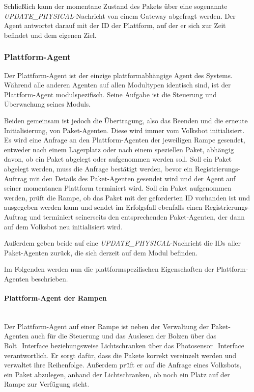 Schließlich kann der momentane Zustand des Pakets über eine sogenannte \textit{UPDATE\_PHYSICAL}-Nachricht von einem Gateway abgefragt werden. Der Agent antwortet darauf mit der ID der Plattform, auf der er sich zur Zeit befindet und dem eigenen Ziel.
\subsubsection{Plattform-Agent}
Der Plattform-Agent ist der einzige plattformabhängige Agent des Systems. Während alle anderen Agenten auf allen Modultypen identisch sind, ist der Plattform-Agent modulspezifisch. Seine Aufgabe ist die Steuerung und Überwachung seines Moduls.

Beiden gemeinsam ist jedoch die Übertragung, also das Beenden und die erneute Initialisierung, von Paket-Agenten. Diese wird immer vom Volksbot initialisiert. Es wird eine Anfrage an den Plattform-Agenten der jeweiligen Rampe gesendet, entweder nach einem Lagerplatz oder nach einem speziellen Paket, abhängig davon, ob ein Paket abgelegt oder aufgenommen werden soll. Soll ein Paket abgelegt werden, muss die Anfrage bestätigt werden, bevor ein Registrierungs-Auftrag mit den Details des Paket-Agenten gesendet wird und der Agent auf seiner momentanen Plattform terminiert wird. Soll ein Paket aufgenommen werden, prüft die Rampe, ob das Paket mit der geforderten ID vorhanden ist und ausgegeben werden kann und sendet im Erfolgsfall ebenfalls einen Registrierungs-Auftrag und terminiert seinerseits den  entsprechenden Paket-Agenten, der dann auf dem Volksbot neu initialisiert wird.

Außerdem geben beide auf eine \textit{UPDATE\_PHYSICAL}-Nachricht die IDs aller Paket-Agenten zurück, die sich derzeit auf dem Modul befinden.

Im Folgenden werden nun die plattformspezifischen Eigenschaften der Plattform-Agenten beschrieben.

\paragraph{Plattform-Agent der Rampen}\mbox{}\\
Der Plattform-Agent auf einer Rampe ist neben der Verwaltung der Paket-Agenten auch für die Steuerung und das Auslesen der Bolzen über das Bolt\_Interface beziehungsweise Lichtschranken über das Photosensor\_Interface verantwortlich. Er sorgt dafür, dass die Pakete korrekt vereinzelt werden und verwaltet ihre Reihenfolge. Außerdem prüft er auf die Anfrage eines Volksbots, ein Paket abzulegen, anhand der Lichtschranken, ob noch ein Platz auf der Rampe zur Verfügung steht.
